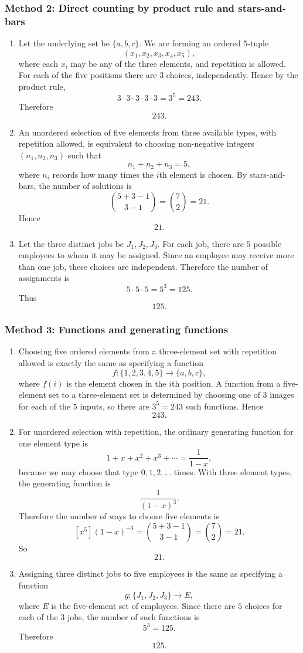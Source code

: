 \documentclass[12pt]{article}
\begin{document}
\subsubsection{Method 2: Direct counting by product rule and stars-and-bars}
\begin{enumerate}[label=(\alph*)]
\item Let the underlying set be $\{a,b,c\}$. We are forming an ordered $5$-tuple
\[
(x_1,x_2,x_3,x_4,x_5),
\]
where each $x_i$ may be any of the three elements, and repetition is allowed. For each of the five positions there are $3$ choices, independently. Hence by the product rule,
\[
3\cdot 3\cdot 3\cdot 3\cdot 3=3^5=243.
\]
Therefore
\[
\boxed{243}.
\]

\item An unordered selection of five elements from three available types, with repetition allowed, is equivalent to choosing non-negative integers $(n_1,n_2,n_3)$ such that
\[
n_1+n_2+n_3=5,
\]
where $n_i$ records how many times the $i$th element is chosen. By stars-and-bars, the number of solutions is
\[
\binom{5+3-1}{3-1}=\binom{7}{2}=21.
\]
Hence
\[
\boxed{21}.
\]

\item Let the three distinct jobs be $J_1,J_2,J_3$. For each job, there are $5$ possible employees to whom it may be assigned. Since an employee may receive more than one job, these choices are independent. Therefore the number of assignments is
\[
5\cdot 5\cdot 5=5^3=125.
\]
Thus
\[
\boxed{125}.
\]
\end{enumerate}

\newpage
\subsubsection{Method 3: Functions and generating functions}
\begin{enumerate}[label=(\alph*)]
\item Choosing five ordered elements from a three-element set with repetition allowed is exactly the same as specifying a function
\[
f:\{1,2,3,4,5\}\to\{a,b,c\},
\]
where $f(i)$ is the element chosen in the $i$th position. A function from a five-element set to a three-element set is determined by choosing one of $3$ images for each of the $5$ inputs, so there are $3^5=243$ such functions. Hence
\[
\boxed{243}.
\]

\item For unordered selection with repetition, the ordinary generating function for one element type is
\[
1+x+x^2+x^3+\cdots = \frac{1}{1-x},
\]
because we may choose that type $0,1,2,\dots$ times. With three element types, the generating function is
\[
\frac{1}{(1-x)^3}.
\]
Therefore the number of ways to choose five elements is
\[
[x^5](1-x)^{-3}=\binom{5+3-1}{3-1}=\binom{7}{2}=21.
\]
So
\[
\boxed{21}.
\]

\item Assigning three distinct jobs to five employees is the same as specifying a function
\[
g:\{J_1,J_2,J_3\}\to E,
\]
where $E$ is the five-element set of employees. Since there are $5$ choices for each of the $3$ jobs, the number of such functions is
\[
5^3=125.
\]
Therefore
\[
\boxed{125}.
\]
\end{enumerate}
\end{document}
